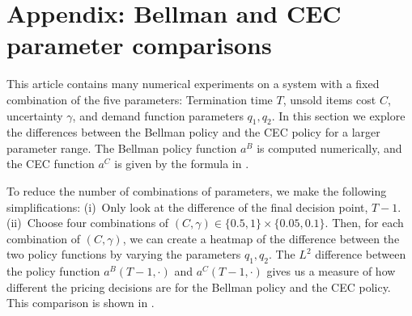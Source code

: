 \documentclass[main.tex]{subfiles}
\begin{document}
\listoftodos

\section*{Appendix: Bellman and CEC parameter comparisons}\label{sec:parameter_comparison}
This article contains many numerical experiments on a system
with a fixed combination of the five parameters:
Termination time $T$, unsold items cost $C$, uncertainty $\gamma$, and
demand function parameters $q_1,q_2$.
In this section we explore the differences between the Bellman policy
and the CEC policy for a larger parameter range.
The Bellman policy function $a^B$ is computed numerically, and
the CEC function $a^C$ is given by the formula in
.

To reduce the number of combinations of parameters, we make the
following simplifications:
(i)~Only look at the difference of the final decision point, $T-1$.
(ii)~Choose four combinations of
$(C,\gamma)\in\{0.5,1\}\times\{0.05,0.1\}$.
Then,
for each combination of $(C,\gamma)$,
we can create a heatmap of the difference between the two policy
functions by varying the parameters $q_1,q_2$.
The $L^2$ difference between the
policy function $a^B(T-1,\cdot)$ and $a^C(T-1,\cdot)$
gives us a measure of how different the pricing decisions are for
the Bellman policy and the CEC policy.
This comparison is shown in .
\end{document}
